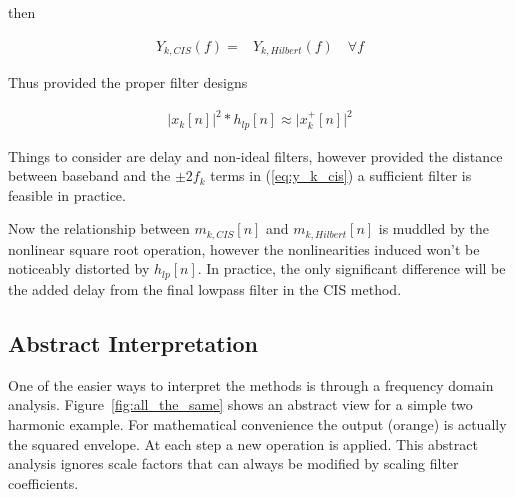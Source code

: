 \documentclass [11pt, proquest,oneside] {ganter_thesis}[2015/03/03]
\begin{document}
then

\begin{align}
Y_{k,CIS}(f) =& Y_{k,Hilbert}(f) \quad \forall f
\end{align}

Thus provided the proper filter designs

\begin{align}
\label{eq:squared_cis_hilbert}
\Big| x_k[n] \Big|^2 * h_{lp}[n] \approx \Big| x^+_k[n] \Big|^2
\end{align}

Things to consider are delay and non-ideal filters, however provided the distance between baseband and the $\pm2f_k$ terms in (\ref{eq:y_k_cis}) a sufficient filter is feasible in practice.

Now the relationship between $m_{k,CIS}[n]$ and $m_{k,Hilbert}[n]$ is muddled by the nonlinear square root operation, however the nonlinearities induced won't be noticeably distorted by $h_{lp}[n]$.  In practice, the only significant difference will be the added delay from the final lowpass filter in the CIS method.

\subsection{Abstract Interpretation}

One of the easier ways to interpret the methods is through a frequency domain analysis.  Figure~\ref{fig:all_the_same} shows an abstract view for a simple two harmonic example.  For mathematical convenience the output (orange) is actually the squared envelope.  At each step a new operation is applied.  This abstract analysis ignores scale factors that can always be modified by scaling filter coefficients.
\end{document}
